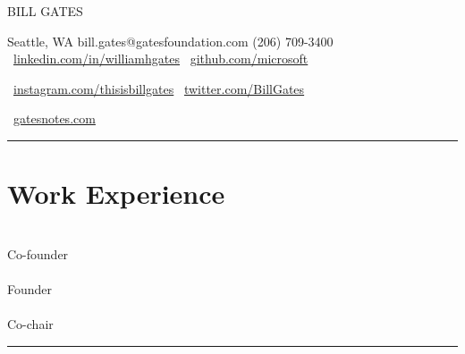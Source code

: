 \documentclass[a4paper]{article}
\begin{document}
\begin{center}
{\Huge BILL GATES}\\%
\end{center}
\vspace{2mm}
Seattle, WA%
\hfill
bill.gates@gatesfoundation.com%
\hfill
(206) 709-3400\\%
\faLinkedinSquare\ \href{https://linkedin.com/in/williamhgates}{linkedin.com/in/williamhgates}%
\hfill
\faGithub\ \href{https://github.com/microsoft}{github.com/microsoft}%

\faInstagram\ \href{https://instagram.com/thisisbillgates}{instagram.com/thisisbillgates}%
\hfill
\faTwitter\ \href{https://twitter.com/JeffBezos}{twitter.com/BillGates}%

\faHome\ \href{https://www.gatesnotes.com}{gatesnotes.com}

\vspace{4mm} \hrule \vspace{3mm}



\section* {Work Experience}

\\
Co-founder\\

\noindent
{}\\
Founder\\

\\
Co-chair\\

\vspace{4mm} \hrule \vspace{3mm}


\end{document}
